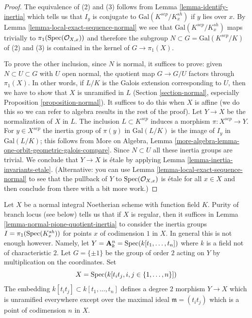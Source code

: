 \begin{proof}
The equivalence of (2) and (3) follows from
Lemma \ref{lemma-identify-inertia}
which tells us that $I_y$ is conjugate to $\text{Gal}(K^{sep}/K_x^{sh})$
if $y$ lies over $x$. By Lemma \ref{lemma-local-exact-sequence-normal}
we see that $\text{Gal}(K^{sep}/K_x^{sh})$ maps trivially to
$\pi_1(\mathop{\mathrm{Spec}}(\mathcal{O}_{X, x}))$ and therefore the subgroup
$N \subset G = \text{Gal}(K^{sep}/K)$
of (2) and (3) is contained in the kernel of
$G \longrightarrow \pi_1(X)$.

\medskip\noindent
To prove the other inclusion, since $N$ is normal, it suffices to prove:
given $N \subset U \subset G$ with $U$ open normal,
the quotient map $G \to G/U$ factors through $\pi_1(X)$.
In other words, if $L/K$ is the Galois extension corresponding
to $U$, then we have to show that $X$ is unramified in $L$
(Section \ref{section-normal}, especially
Proposition \ref{proposition-normal}).
It suffices to do this when $X$ is affine (we do this
so we can refer to algebra results in the rest of the proof).
Let $Y \to X$ be the normalization of $X$ in $L$.
The inclusion $L \subset K^{sep}$ induces a morphism
$\pi : X^{sep} \to Y$. For $y \in X^{sep}$
the inertia group of $\pi(y)$ in $\text{Gal}(L/K)$
is the image of $I_y$ in $\text{Gal}(L/K)$; this follows
from More on Algebra, Lemma
\ref{more-algebra-lemma-one-orbit-geometric-galois-compare}.
Since $N \subset U$ all these inertia groups are trivial.
We conclude that $Y \to X$ is \'etale by applying
Lemma \ref{lemma-inertia-invariants-etale}.
(Alternative: you can use Lemma \ref{lemma-local-exact-sequence-normal}
to see that the pullback of $Y$ to $\mathop{\mathrm{Spec}}(\mathcal{O}_{X, x})$ is
\'etale for all $x \in X$ and then conclude from there
with a bit more work.)
\end{proof}

\begin{example}
\label{example-bigger-codim}
Let $X$ be a normal integral Noetherian scheme with function field $K$.
Purity of branch locus (see below) tells us that if $X$ is regular, then
it suffices in Lemma \ref{lemma-normal-pione-quotient-inertia}
to consider the inertia groups $I = \pi_1(\mathop{\mathrm{Spec}}(K_x^{sh}))$
for points $x$ of codimension $1$ in $X$.
In general this is not enough however. Namely, let
$Y = \mathbf{A}_k^n = \mathop{\mathrm{Spec}}(k[t_1, \ldots, t_n])$
where $k$ is a field not of characteristic $2$.
Let $G = \{\pm 1\}$ be the group of order $2$ acting on $Y$
by multiplication on the coordinates. Set
$$
X = \mathop{\mathrm{Spec}}(k[t_it_j, i, j \in \{1, \ldots, n\}])
$$
The embedding $k[t_it_j] \subset k[t_1, \ldots, t_n]$
defines a degree $2$ morphism $Y \to X$ which is unramified everywhere
except over the maximal ideal $\mathfrak m = (t_it_j)$
which is a point of codimension $n$ in $X$.
\end{example}

